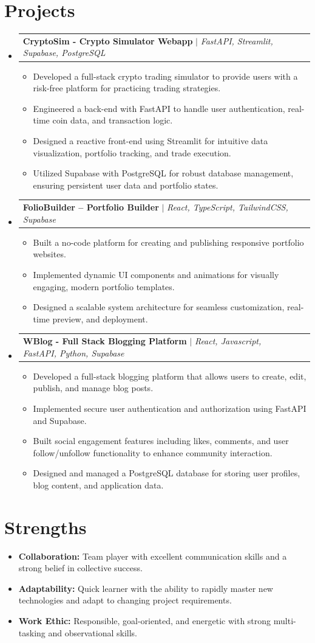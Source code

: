 \documentclass[letterpaper,11pt]{article}
\makeatletter
\newcommand{\resumeItem}[1]{
  \item\small{
    {#1 \vspace{-2pt}}
  }
}
\newcommand{\resumeProjectHeading}[2]{
    \item
    \begin{tabular*}{0.97\textwidth}{l@{\extracolsep{\fill}}r}
      \small#1 & #2 \\
    \end{tabular*}\vspace{-7pt}
}
\newcommand{\resumeSubHeadingListStart}{\begin{itemize}[leftmargin=0.15in, label={}]}
\newcommand{\resumeSubHeadingListEnd}{\end{itemize}}
\newcommand{\resumeItemListStart}{\begin{itemize}}
\newcommand{\resumeItemListEnd}{\end{itemize}\vspace{-5pt}}
\makeatother
\begin{document}
\section{Projects}
    \resumeSubHeadingListStart
      \resumeProjectHeading
          {\textbf{CryptoSim - Crypto Simulator Webapp} $|$ \emph{FastAPI, Streamlit, Supabase, PostgreSQL}}{}
          \resumeItemListStart
            \resumeItem{Developed a full-stack crypto trading simulator to provide users with a risk-free platform for practicing trading strategies.}
            \resumeItem{Engineered a back-end with FastAPI to handle user authentication, real-time coin data, and transaction logic.}
            \resumeItem{Designed a reactive front-end using Streamlit for intuitive data visualization, portfolio tracking, and trade execution.}
            \resumeItem{Utilized Supabase with PostgreSQL for robust database management, ensuring persistent user data and portfolio states.}
          \resumeItemListEnd
          
      \resumeProjectHeading
          {\textbf{FolioBuilder – Portfolio Builder} $|$ \emph{React, TypeScript, TailwindCSS, Supabase
}}{}
          \resumeItemListStart
            \resumeItem{Built a no-code platform for creating and publishing responsive portfolio websites.}
            \resumeItem{Implemented dynamic UI components and animations for visually engaging, modern portfolio templates.}
            \resumeItem{Designed a scalable system architecture for seamless customization, real-time preview, and deployment.}
          \resumeItemListEnd
          
          \resumeProjectHeading
          {\textbf{WBlog - Full Stack Blogging Platform} $|$ \emph{React, Javascript, FastAPI, Python, Supabase
}}{}
          \resumeItemListStart
            \resumeItem{Developed a full-stack blogging platform that allows users to create, edit, publish, and manage blog posts.}
            \resumeItem{Implemented secure user authentication and authorization using FastAPI and Supabase.}
            \resumeItem{Built social engagement features including likes, comments, and user follow/unfollow functionality to enhance
community interaction.}
            \resumeItem{Designed and managed a PostgreSQL database for storing user profiles, blog content, and application data.}
          \resumeItemListEnd
    \resumeSubHeadingListEnd


\section{Strengths}
    \resumeSubHeadingListStart
        \resumeItem{\textbf{Collaboration:} Team player with excellent communication skills and a strong belief in collective success.}
        \resumeItem{\textbf{Adaptability:} Quick learner with the ability to rapidly master new technologies and adapt to changing project requirements.}
        \resumeItem{\textbf{Work Ethic:} Responsible, goal-oriented, and energetic with strong multi-tasking and observational skills.}
    \resumeSubHeadingListEnd
\end{document}
